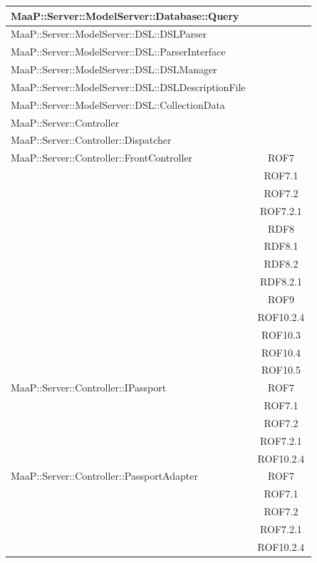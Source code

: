 \begin{center}
\begin{longtable}{|p{0.8\linewidth}|c|}
\midrule 
MaaP::Server::ModelServer::Database::Query
& \\

\midrule 
MaaP::Server::ModelServer::DSL::DSLParser
& \\

\midrule 
MaaP::Server::ModelServer::DSL::ParserInterface
& \\

\midrule 
MaaP::Server::ModelServer::DSL::DSLManager
& \\

\midrule 
MaaP::Server::ModelServer::DSL::DSLDescriptionFile
& \\

\midrule 
MaaP::Server::ModelServer::DSL::CollectionData
& \\

\midrule 
MaaP::Server::Controller 
& \\

\midrule 
MaaP::Server::Controller::Dispatcher
& \\

\midrule 
MaaP::Server::Controller::FrontController
& ROF7\\
& ROF7.1\\
& ROF7.2\\
& ROF7.2.1\\
& RDF8\\
& RDF8.1\\
& RDF8.2\\
& RDF8.2.1\\
& ROF9\\
& ROF10.2.4\\
& ROF10.3\\
& ROF10.4\\
& ROF10.5\\



\midrule 
MaaP::Server::Controller::IPassport
& ROF7\\
& ROF7.1\\
& ROF7.2\\
& ROF7.2.1\\
& ROF10.2.4\\

\midrule 
MaaP::Server::Controller::PassportAdapter 
& ROF7\\
& ROF7.1\\
& ROF7.2\\
& ROF7.2.1\\
& ROF10.2.4\\


\end{longtable}
\end{center}
